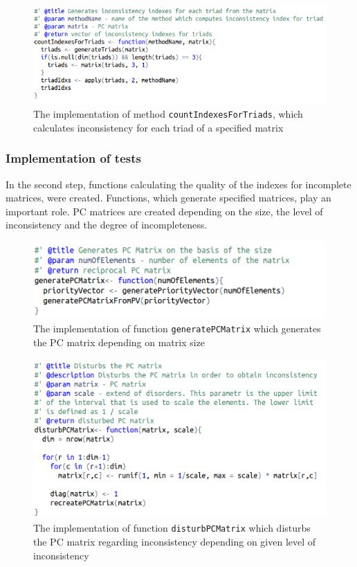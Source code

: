 \begin{figure}[h]
\centerline{\includegraphics[scale=0.75]{images/kod5.png}}
\caption{The implementation of method \texttt{countIndexesForTriads}, which calculates inconsistency for each triad of a specified matrix}
\label{fig:rstudio}
\end{figure}


\subsubsection{Implementation of tests}
In the second step, functions calculating the quality of the indexes for incomplete matrices, were created. Functions, which generate specified matrices, play an important role. PC matrices are created depending on the size, the level of inconsistency and the degree of incompleteness.

\begin{figure}[h]
\centerline{\includegraphics[scale=0.75]{images/kod11.png}}
\caption{The implementation of function \texttt{generatePCMatrix} which generates the PC matrix depending on matrix size}
\label{fig:rstudio}
\end{figure}

\begin{figure}[h]
\centerline{\includegraphics[scale=0.75]{images/kod12.png}}
\caption{The implementation of function \texttt{disturbPCMatrix} which disturbs the PC matrix regarding inconsistency depending on given level of inconsistency}
\label{fig:rstudio}
\end{figure}

